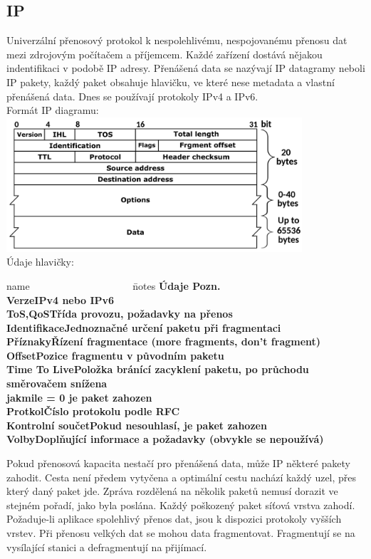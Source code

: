   \subsection{IP}
    Univerzální přenosový protokol k nespolehlivému, nespojovanému přenosu dat mezi zdrojovým počítačem a příjemcem.
    Každé zařízení dostává nějakou indentifikaci v podobě IP adresy.
    Přenášená data se nazývají IP datagramy neboli IP pakety, každý paket obsahuje hlavičku, ve které nese metadata a vlastní přenášená data.
    Dnes se používají protokoly IPv4 a IPv6. \\
    Formát IP diagramu: \\
    \includegraphics[height=5cm]{TVY-POS/ISO-OSI-TCP-IP/IPv4.png} \\
    Údaje hlavičky:
    \begin{tabbing}
      name ~~~~~~~~~~~~~~~~~~~~\= notes \kill
      \bfseries Údaje \>\bfseries Pozn.\\[2mm]
      Verze\>IPv4 nebo IPv6\\
      ToS,QoS\>Třída provozu, požadavky na přenos\\
      Identifikace\>Jednoznačné určení paketu při fragmentaci\\
      Příznaky\>Řízení fragmentace (more fragments, don't fragment)\\
      Offset\>Pozice fragmentu v původním paketu\\
      Time To Live\>Položka bránící zacyklení paketu, po průchodu směrovačem snížena\\
      \>jakmile = 0 je paket zahozen\\
      Protkol\>Číslo protokolu podle RFC\\
      Kontrolní součet\>Pokud nesouhlasí, je paket zahozen\\
      Volby\>Doplňující informace a požadavky (obvykle se nepoužívá)\\
    \end{tabbing}
    Pokud přenosová kapacita nestačí pro přenášená data, může IP některé pakety zahodit.
    Cesta není předem vytyčena a optimální cestu nachází každý uzel, přes který daný paket jde.
    Zpráva rozdělená na několik paketů nemusí dorazit ve stejném pořadí, jako byla poslána.
    Každý poškozený paket síťová vrstva zahodí.
    Požaduje-li aplikace spolehlivý přenos dat, jsou k dispozici protokoly vyšších vrstev.
    Při přenosu velkých dat se mohou data fragmentovat.
    Fragmentují se na vysílající stanici a defragmentují na přijímací.